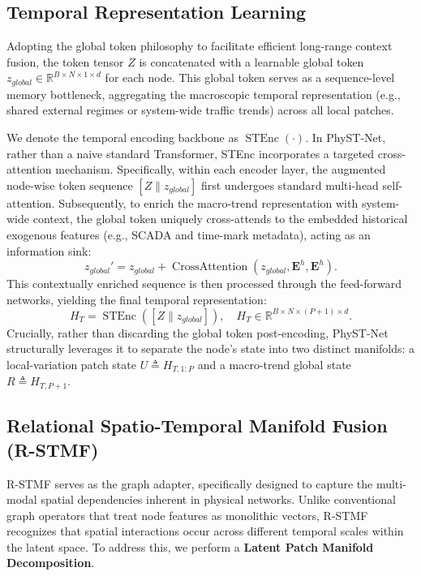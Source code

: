 \subsection{Temporal Representation Learning}
\label{sec:temporal_encoder}
Adopting the global token philosophy \cite{wang2024timexer} to facilitate efficient long-range context fusion, the token tensor $Z$ is concatenated with a learnable global token $z_{global} \in \mathbb{R}^{B \times N \times 1 \times d}$ for each node. This global token serves as a sequence-level memory bottleneck, aggregating the macroscopic temporal representation (e.g., shared external regimes or system-wide traffic trends) across all local patches. 

We denote the temporal encoding backbone as $\operatorname{STEnc}(\cdot)$. In PhyST-Net, rather than a naive standard Transformer, STEnc incorporates a targeted cross-attention mechanism. Specifically, within each encoder layer, the augmented node-wise token sequence $[Z \parallel z_{global}]$ first undergoes standard multi-head self-attention. Subsequently, to enrich the macro-trend representation with system-wide context, the global token uniquely cross-attends to the embedded historical exogenous features (e.g., SCADA and time-mark metadata), acting as an information sink:
\begin{equation}
z_{global}' = z_{global} + \operatorname{CrossAttention}(z_{global}, \mathbf{E}^h, \mathbf{E}^h).
\label{eq:cross_attention}
\end{equation}
This contextually enriched sequence is then processed through the feed-forward networks, yielding the final temporal representation:
\begin{equation}
H_T=\operatorname{STEnc}([Z \parallel z_{global}]), \quad H_T\in\mathbb{R}^{B\times N\times (P+1)\times d}.
\label{eq:temporal_encoder}
\end{equation}
Crucially, rather than discarding the global token post-encoding, PhyST-Net structurally leverages it to separate the node's state into two distinct manifolds: a local-variation patch state $U \triangleq H_{T,1:P}$ and a macro-trend global state $R \triangleq H_{T,P+1}$.

\subsection{Relational Spatio-Temporal Manifold Fusion (R-STMF)}
\label{sec:rstmf}
R-STMF serves as the graph adapter, specifically designed to capture the multi-modal spatial dependencies inherent in physical networks. Unlike conventional graph operators that treat node features as monolithic vectors, R-STMF recognizes that spatial interactions occur across different temporal scales within the latent space. To address this, we perform a \textbf{Latent Patch Manifold Decomposition}.

